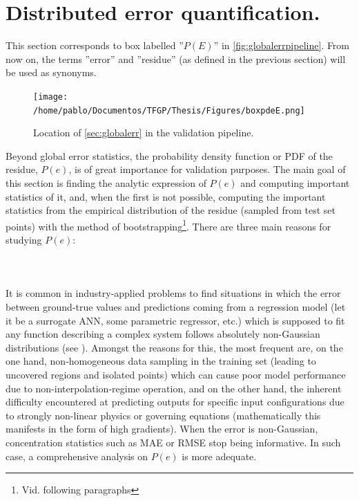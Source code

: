 \section{Distributed error quantification.}\label{sec:disterr}
\noindent This section corresponds to box labelled ''$P(E)$'' in \autoref{fig:globalerrpipeline}. From now on, the terms ''error'' and ''residue'' (as defined in the previous section) will be used as synonyms.\\
\begin{figure}[!htb]
	\centering
	\texttt{[image: /home/pablo/Documentos/TFGP/Thesis/Figures/boxpdeE.png]}
	\caption{Location of \autoref{sec:globalerr} in the validation pipeline.}
	\label{fig:globalerrpipeline}
\end{figure}
%
\indent Beyond global error statistics, the probability density function or PDF of the residue, $P(e)$, is of great importance for validation purposes. The main goal of this section is finding the analytic expression of $P(e)$ and computing important statistics of it, and, when the first is not possible, computing the important statistics from the empirical distribution of the residue (sampled from test set points) with the method of bootstrapping\footnote{Vid. following paragraphs}. There are three main reasons for studying $P(e)$:\\
\paragraph{ \\}
It is common in industry-applied problems to find situations in which the error between ground-true values and predictions coming from a regression model (let it be a surrogate ANN, some parametric regressor, etc.) which is supposed to fit any function describing a complex system follows absolutely non-Gaussian distributions (see \eg \cite{chen2003non,pernot2020impact,smyl2021learning,chai2019using}). Amongst the reasons for this, the most frequent are, on the one hand, non-homogeneous data sampling in the training set (leading to uncovered regions and isolated points) which can cause poor model performance due to non-interpolation-regime operation, and on the other hand, the inherent difficulty encountered at predicting outputs for specific input configurations due to strongly non-linear physics or governing equations (mathematically this manifests in the form of high gradients). When the error is non-Gaussian, concentration statistics such as MAE or RMSE stop being informative. In such case, a comprehensive analysis on $P(e)$ is more adequate.\\
%

